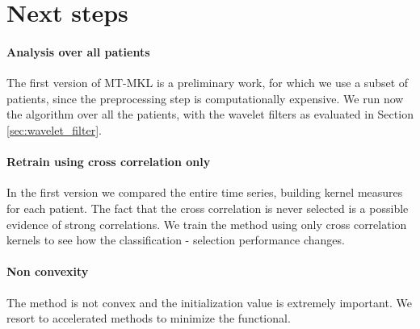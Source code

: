 \documentclass[a4paper]{article}
\begin{document}
\section{Next steps}

\paragraph{Analysis over all patients} The first version of MT-MKL is a preliminary work, for which we use a subset of patients, since the preprocessing step is computationally expensive. We run now the algorithm over all the patients, with the wavelet filters as evaluated in Section \ref{sec:wavelet_filter}.
\paragraph{Retrain using cross correlation only} In the first version we compared the entire time series, building kernel measures for each patient. The fact that the cross correlation is never selected is a possible evidence of strong correlations. We train the method using only cross correlation kernels to see how the classification - selection performance changes.
\paragraph{Non convexity} The method is not convex and the initialization value is extremely important. We resort to accelerated methods to minimize the functional.
\end{document}
